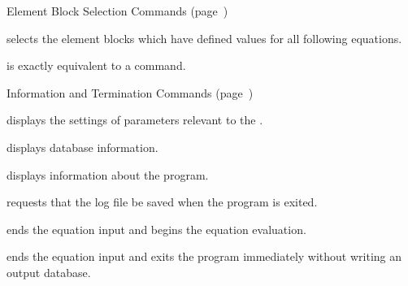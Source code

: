 \bigskip \begin{center}
Element Block Selection Commands (page~\pageref{cmd:blocksel})
\end{center}

 {
selects the element blocks which have defined values for all following
equations.
}

 {
is exactly equivalent to a \cmd{BLOCKS} command.
}

\newpage %
\bigskip \begin{center}
Information and Termination Commands (page~\pageref{cmd:infoterm})
\end{center}

 {
displays the settings of parameters relevant to the .
}

 {
displays database information.
}

 {
displays information about the \caps{\PROGRAM} program.
}

 {
requests that the log file be saved when the program is exited.
}

 {
ends the equation input and begins the equation evaluation.
}

 {
ends the equation input and exits the program immediately without
writing an output database.
}
